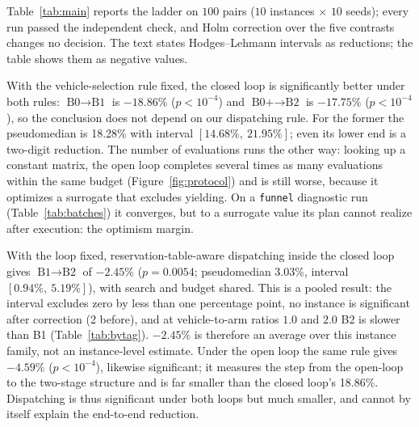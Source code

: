 \documentclass[preprint,review,12pt,authoryear,doubleblind]{elsarticle}
\newcommand{\NCases}{10}
\newcommand{\NSeeds}{10}
\newcommand{\NPairs}{100}
\newcommand{\GainLoopRule}{18.86\%}      %
\newcommand{\PLoopRule}{<10^{-4}}
\newcommand{\GainLoopProbe}{17.75\%}     %
\newcommand{\PLoopProbe}{<10^{-4}}
\newcommand{\GainProbeOpen}{4.59\%}      %
\newcommand{\PProbeOpen}{<10^{-4}}
\newcommand{\GainProbeLoop}{2.45\%}      %
\newcommand{\PProbeLoop}{=0.0054}
\newcommand{\HLLoopRule}{18.28\%}
\newcommand{\CILoopRule}{$[14.68\%,\ 21.95\%]$}
\newcommand{\HLProbeLoop}{3.03\%}
\newcommand{\CIProbeLoop}{$[0.94\%,\ 5.19\%]$}
\newcommand{\CellsSigProbe}{2}
\begin{document}
Table~\ref{tab:main} reports the ladder on $\NPairs$ pairs ($\NCases$ instances $\times$ $\NSeeds$ seeds); every run passed the independent check, and Holm correction over the five contrasts changes no decision.
The text states Hodges--Lehmann intervals as reductions; the table shows them as negative values.

\begin{table}[!htbp]
\caption{Four-level ladder under an equal wall-clock budget, and the four one-factor contrasts. Negative is better.
$n=\NPairs$ pairs on $(\text{instance},\text{seed})$; two-sided Wilcoxon signed-rank, Holm-corrected over the five contrasts
($^{*}p<0.05$, $^{**}p<0.01$, $^{***}p<0.001$). HL: Hodges--Lehmann pseudomedian with $95\%$ interval.
Bold marks our configuration, not a per-instance winner.}
\label{tab:main}
\small

\end{table}

With the vehicle-selection rule fixed, the closed loop is significantly better under both rules: $\text{B0}\to\text{B1}$ is $-\GainLoopRule$ ($p\PLoopRule$) and $\text{B0+}\to\text{B2}$ is $-\GainLoopProbe$ ($p\PLoopProbe$), so the conclusion does not depend on our dispatching rule.
For the former the pseudomedian is \HLLoopRule{} with interval \CILoopRule{}; even its lower end is a two-digit reduction.
The number of evaluations runs the other way: looking up a constant matrix, the open loop completes several times as many evaluations within the same budget (Figure~\ref{fig:protocol}) and is still worse, because it optimizes a surrogate that excludes yielding.
On a \texttt{funnel} diagnostic run (Table~\ref{tab:batches}) it converges, but to a surrogate value its plan cannot realize after execution: the optimism margin.

With the loop fixed, reservation-table-aware dispatching inside the closed loop gives $\text{B1}\to\text{B2}$ of $-\GainProbeLoop$ ($p\PProbeLoop$; pseudomedian \HLProbeLoop{}, interval \CIProbeLoop{}), with search and budget shared.
This is a pooled result: the interval excludes zero by less than one percentage point, no instance is significant after correction (\CellsSigProbe{} before), and at vehicle-to-arm ratios $1.0$ and $2.0$ B2 is slower than B1 (Table~\ref{tab:bytag}).
$-\GainProbeLoop$ is therefore an average over this instance family, not an instance-level estimate.
Under the open loop the same rule gives $-\GainProbeOpen$ ($p\PProbeOpen$), likewise significant; it measures the step from the open-loop to the two-stage structure and is far smaller than the closed loop's \GainLoopRule{}.
Dispatching is thus significant under both loops but much smaller, and cannot by itself explain the end-to-end reduction.
\end{document}
